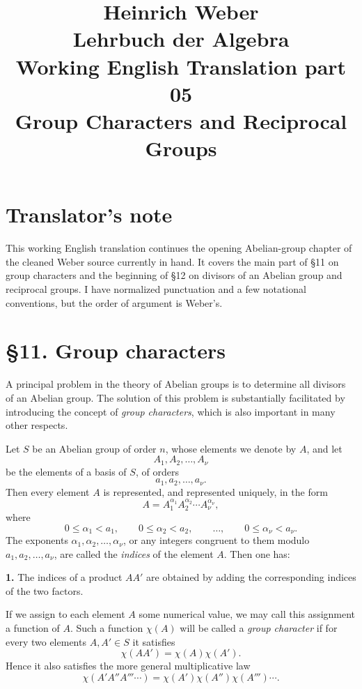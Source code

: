 \documentclass[11pt]{article}
\title{Heinrich Weber\\Lehrbuch der Algebra\\Working English Translation part 05\\Group Characters and Reciprocal Groups}
\author{}
\date{}
\begin{document}
\maketitle

\section*{Translator's note}
This working English translation continues the opening Abelian-group chapter of the cleaned Weber source currently in hand. It covers the main part of \S 11 on group characters and the beginning of \S 12 on divisors of an Abelian group and reciprocal groups. I have normalized punctuation and a few notational conventions, but the order of argument is Weber's.

\section*{\S 11. Group characters}

A principal problem in the theory of Abelian groups is to determine all divisors of an Abelian group. The solution of this problem is substantially facilitated by introducing the concept of \emph{group characters}, which is also important in many other respects.

Let \(S\) be an Abelian group of order \(n\), whose elements we denote by \(A\), and let
\[
A_1,A_2,\dots,A_\nu
\tag{1}
\]
be the elements of a basis of \(S\), of orders
\[
a_1,a_2,\dots,a_\nu.
\]
Then every element \(A\) is represented, and represented uniquely, in the form
\[
A = A_1^{\alpha_1}A_2^{\alpha_2}\cdots A_\nu^{\alpha_\nu},
\tag{2}
\]
where
\[
0\le \alpha_1<a_1,\qquad 0\le \alpha_2<a_2,\qquad \dots,\qquad 0\le \alpha_\nu<a_\nu.
\tag{3}
\]
The exponents \(\alpha_1,\alpha_2,\dots,\alpha_\nu\), or any integers congruent to them modulo \(a_1,a_2,\dots,a_\nu\), are called the \emph{indices} of the element \(A\). Then one has:

\medskip
\noindent\textbf{1.} The indices of a product \(AA'\) are obtained by adding the corresponding indices of the two factors.

\medskip
If we assign to each element \(A\) some numerical value, we may call this assignment a function of \(A\). Such a function \(\chi(A)\) will be called a \emph{group character} if for every two elements \(A,A'\in S\) it satisfies
\[
\chi(AA')=\chi(A)\chi(A').
\tag{4}
\]
Hence it also satisfies the more general multiplicative law
\[
\chi(A'A''A'''\cdots)=\chi(A')\chi(A'')\chi(A''')\cdots.
\]
\end{document}

